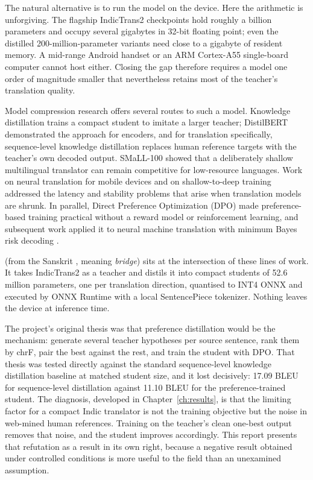 The natural alternative is to run the model on the device. Here the arithmetic
is unforgiving. The flagship IndicTrans2 checkpoints hold roughly a billion
parameters and occupy several gigabytes in 32-bit floating point; even the
distilled 200-million-parameter variants need close to a gigabyte of resident
memory. A mid-range Android handset or an ARM Cortex-A55 single-board computer
cannot host either. Closing the gap therefore requires a model one order of
magnitude smaller that nevertheless retains most of the teacher's translation
quality.

Model compression research offers several routes to such a model.
Knowledge distillation trains a compact student to imitate a larger teacher;
DistilBERT \cite{ref:distilbert} demonstrated the approach for encoders, and for
translation specifically, sequence-level knowledge distillation replaces human
reference targets with the teacher's own decoded output. SMaLL-100
\cite{ref:small100} showed that a deliberately shallow multilingual translator can
remain competitive for low-resource languages. Work on neural translation for
mobile devices \cite{ref:mobilenmt} and on shallow-to-deep training
\cite{ref:shallow2deep} addressed the latency and stability problems that arise
when translation models are shrunk. In parallel, Direct Preference Optimization
(DPO) \cite{ref:dpo} made preference-based training practical without a reward
model or reinforcement learning, and subsequent work applied it to neural
machine translation with minimum Bayes risk decoding \cite{ref:dpomt}.

\setu{} (from the Sanskrit , meaning \emph{bridge}) sits at the
intersection of these lines of work. It takes IndicTrans2 as a teacher and
distils it into compact students of 52.6 million parameters, one per translation
direction, quantised to INT4 ONNX and executed by ONNX Runtime with a local
SentencePiece tokenizer. Nothing leaves the device at inference time.

The project's original thesis was that preference distillation would be the
mechanism: generate several teacher hypotheses per source sentence, rank them by
chrF, pair the best against the rest, and train the student with DPO. That
thesis was tested directly against the standard sequence-level knowledge
distillation baseline at matched student size, and it lost decisively:
17.09 BLEU for sequence-level distillation against 11.10 BLEU for the
preference-trained student. The diagnosis, developed in
Chapter~\ref{ch:results}, is that the limiting factor for a compact Indic
translator is not the training objective but the noise in web-mined human
references. Training on the teacher's clean one-best output removes that noise,
and the student improves accordingly. This report presents that refutation as a
result in its own right, because a negative result obtained under controlled
conditions is more useful to the field than an unexamined assumption.

